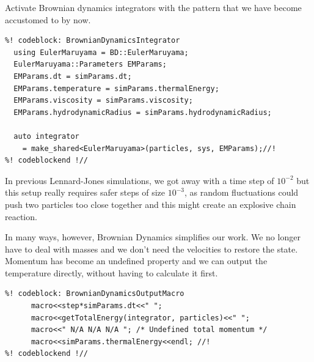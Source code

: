 Activate Brownian dynamics integrators with the pattern that we have become 
accustomed to by now.
\begin{lstlisting}
%! codeblock: BrownianDynamicsIntegrator
  using EulerMaruyama = BD::EulerMaruyama;
  EulerMaruyama::Parameters EMParams;
  EMParams.dt = simParams.dt;
  EMParams.temperature = simParams.thermalEnergy;
  EMParams.viscosity = simParams.viscosity;
  EMParams.hydrodynamicRadius = simParams.hydrodynamicRadius;

  auto integrator
    = make_shared<EulerMaruyama>(particles, sys, EMParams);//!
%! codeblockend !//
\end{lstlisting}
In previous Lennard-Jones simulations, we got away with a time step of $10^{-2}$ 
but this setup really requires safer steps of size $10^{-3}$, as random 
fluctuations could push two particles too close together and this might create 
an explosive chain reaction.

In many ways, however, Brownian Dynamics simplifies our work. We no longer have 
to deal with masses and we don't need the velocities to restore the state. 
Momentum has become an undefined property and we can output the temperature 
directly, without having to calculate it first.
\begin{lstlisting}
%! codeblock: BrownianDynamicsOutputMacro
      macro<<step*simParams.dt<<" ";
      macro<<getTotalEnergy(integrator, particles)<<" ";
      macro<<" N/A N/A N/A "; /* Undefined total momentum */
      macro<<simParams.thermalEnergy<<endl; //!
%! codeblockend !//
\end{lstlisting}

